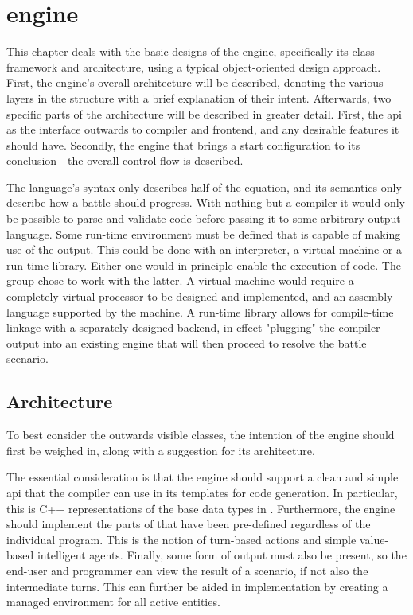 \section{\langname{} engine}
This chapter deals with the basic designs of the engine, specifically its class framework and architecture, using a typical object-oriented design approach. First, the engine's overall architecture will be described, denoting the various layers in the structure with a brief explanation of their intent. Afterwards, two specific parts of the architecture will be described in greater detail. First, the \ac{api} as the interface outwards to compiler and frontend, and any desirable features it should have. Secondly, the engine that brings a start configuration to its conclusion - the overall control flow is described.

The language's syntax only describes half of the equation, and its semantics only describe how a battle should progress. With nothing but a compiler it would only be possible to parse and validate code before passing it to some arbitrary output language. Some run-time environment must be defined that is capable of making use of the output. This could be done with an interpreter, a virtual machine or a run-time library. Either one would in principle enable the execution of code. The group chose to work with the latter. A virtual machine would require a completely virtual processor to be designed and implemented, and an assembly language supported by the machine.
A run-time library allows for compile-time linkage with a separately designed backend, in effect "plugging" the \langname{} compiler output into an existing engine that will then proceed to resolve the battle scenario.

\pagebreak
\subsection*{Architecture}

To best consider the outwards visible classes, the intention of the engine should first be weighed in, along with a suggestion for its architecture.

The essential consideration is that the engine should support a clean and simple \ac{api} that the compiler can use in its templates for code generation. In particular, this is C++ representations of the base data types in \langname{}. Furthermore, the engine should implement the parts of \langname{} that have been pre-defined regardless of the individual program. This is the notion of turn-based actions and simple value-based intelligent agents. Finally, some form of output must also be present, so the end-user and programmer can view the result of a scenario, if not also the intermediate turns. This can further be aided in implementation by creating a managed environment for all active \langname{} entities.

